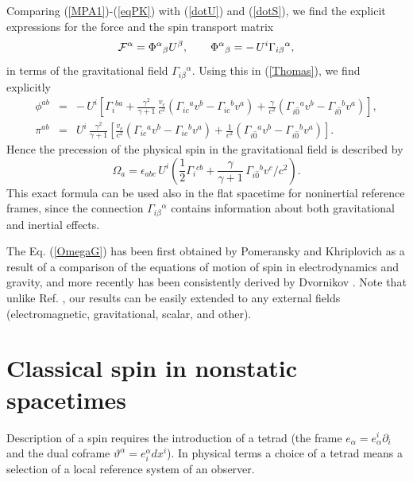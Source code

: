 \documentclass[preprint,showpacs,preprintnumbers,amsmath,amssymb]{revtex4}
\begin{document}
Comparing (\ref{MPA1})-(\ref{eqPK}) with (\ref{dotU}) and (\ref{dotS}),
we find the explicit expressions for the force and the spin transport
matrix
\begin{equation}
{\cal F}^\alpha = \Phi^\alpha{}_\beta U^\beta,\qquad \Phi^\alpha{}_\beta
= -\,U^i\Gamma_{i\beta}{}^\alpha,\label{forceG}
\end{equation}
in terms of the gravitational field $\Gamma_{i\beta}{}^\alpha$.
Using this in (\ref{Thomas}), we find explicitly
\begin{eqnarray}
\phi^{ab} &=& -\,U^i\left[\Gamma_i{}^{ba} + {\frac {\gamma^2}{\gamma + 1}}
\,{\frac {v_c}{c^2}}\left(\Gamma_{ic}{}^av^b - \Gamma_{ic}{}^bv^a\right) +
{\frac {\gamma}{c^2}}\left(\Gamma_{i\widehat{0}}{}^av^b
- \Gamma_{i\widehat{0}}{}^b v^a\right)\right],\\
\pi^{ab} &=& U^i\,{\frac {\gamma^2}{\gamma + 1}}\left[{\frac {v_c}{c^2}}
\left(\Gamma_{ic}{}^av^b - \Gamma_{ic}{}^bv^a\right) + {\frac 1 {c^2}}\left(
\Gamma_{i\widehat{0}}{}^av^b - \Gamma_{i\widehat{0}}{}^bv^a\right)\right].
\end{eqnarray}
Hence the precession of the physical spin in the gravitational field is
described by
\begin{equation}
\Omega_{a} = \epsilon_{abc}\,U^i\left({\frac 12}\Gamma_i{}^{cb} + {\frac
{\gamma}{\gamma + 1}}\,\Gamma_{i\widehat{0}}{}^bv^c/c^2\right).\label{OmegaG}
\end{equation}
This exact formula can be used also in the flat spacetime for noninertial
reference frames, since the connection $\Gamma_{i\beta}{}^\alpha$ contains
information about both gravitational and inertial effects.

The Eq. (\ref{OmegaG}) has been first obtained by Pomeransky and Khriplovich
\cite{PK} as a result of a comparison of the equations of motion of spin in
electrodynamics and gravity, and more recently has been consistently derived
by Dvornikov \cite{Dvornikov}. Note that unlike Ref. \cite{Dvornikov},
our results can be easily extended to any external fields (electromagnetic,
gravitational, scalar, and other).

\section{Classical spin in nonstatic spacetimes}\label{tetrad}

Description of a spin requires the introduction of a tetrad (the frame
$e_\alpha = e_\alpha^i\partial_i$ and the dual coframe $\vartheta^\alpha
= e^\alpha_idx^i$). In physical terms a choice of a tetrad means a
selection of a local reference system of an observer.
\end{document}
